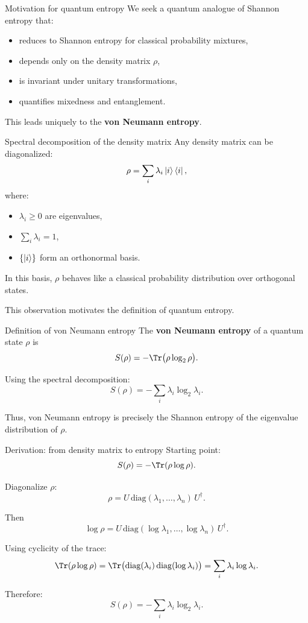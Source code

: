 \documentclass[aspectratio=169]{beamer}
\begin{document}
\begin{frame}{Motivation for quantum entropy}
We seek a quantum analogue of Shannon entropy that:
\begin{itemize}
\item reduces to Shannon entropy for classical probability mixtures,
\item depends only on the density matrix $\rho$,
\item is invariant under unitary transformations,
\item quantifies mixedness and entanglement.
\end{itemize}

\medskip
This leads uniquely to the \textbf{von Neumann entropy}.
\end{frame}

\begin{frame}{Spectral decomposition of the density matrix}
Any density matrix can be diagonalized:
\[
\rho = \sum_i \lambda_i \ket{i}\bra{i},
\]
where:
\begin{itemize}
\item $\lambda_i \ge 0$ are eigenvalues,
\item $\sum_i \lambda_i = 1$,
\item $\{\ket{i}\}$ form an orthonormal basis.
\end{itemize}

\medskip
In this basis, $\rho$ behaves like a classical probability distribution
over orthogonal states.

\medskip
This observation motivates the definition of quantum entropy.
\end{frame}

\begin{frame}{Definition of von Neumann entropy}
The \textbf{von Neumann entropy} of a quantum state $\rho$ is
\[
S(\rho) = -\Tr\big(\rho \log_2 \rho\big).
\]

\medskip
Using the spectral decomposition:
\[
S(\rho) = -\sum_i \lambda_i \log_2 \lambda_i.
\]

\medskip
Thus, von Neumann entropy is precisely the Shannon entropy of the
eigenvalue distribution of $\rho$.
\end{frame}

\begin{frame}{Derivation: from density matrix to entropy}
Starting point:
\[
S(\rho) = -\Tr(\rho \log \rho).
\]

Diagonalize $\rho$:
\[
\rho = U \, \mathrm{diag}(\lambda_1,\dots,\lambda_n)\, U^\dagger.
\]

Then
\[
\log \rho = U \, \mathrm{diag}(\log \lambda_1,\dots,\log \lambda_n)\, U^\dagger.
\]

Using cyclicity of the trace:
\[
\Tr(\rho \log \rho)
= \Tr\big(\mathrm{diag}(\lambda_i)\,\mathrm{diag}(\log \lambda_i)\big)
= \sum_i \lambda_i \log \lambda_i.
\]

Therefore:
\[
S(\rho) = -\sum_i \lambda_i \log_2 \lambda_i.
\]
\end{frame}
\end{document}
